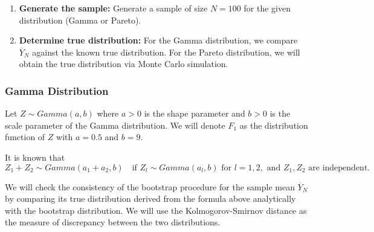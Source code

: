 \documentclass{article}
\begin{document}
\begin{enumerate}
  \item \textbf{Generate the sample:} Generate a sample of size \(N = 100\) for the given distribution (Gamma or Pareto).
  \item \textbf{Determine true distribution:} For the Gamma distribution, we compare \(\overline{Y}_N\) against the known true distribution. For the Pareto distribution, we will obtain the true distribution via Monte Carlo simulation.
\end{enumerate}

\subsubsection{Gamma Distribution}

Let \(Z \sim Gamma(a, b)\) where \(a > 0\) is the shape parameter and \(b > 0\) is the scale parameter of the Gamma distribution. We will denote \(F_1\) as the distribution function of \(Z\) with \(a = 0.5\) and \(b = 9\).

It is known that
\[
Z_1 + Z_2 \sim Gamma(a_1 + a_2, b) \quad \text{if } Z_l \sim Gamma(a_l, b) \text{ for } l = 1, 2, \text{ and } Z_1, Z_2 \text{ are independent}.
\]

We will check the consistency of the bootstrap procedure for the sample mean \(\overline{Y}_N\) by comparing its true distribution derived from the formula above analytically with the bootstrap distribution. We will use the Kolmogorov-Smirnov distance as the measure of discrepancy between the two distributions.
\end{document}
